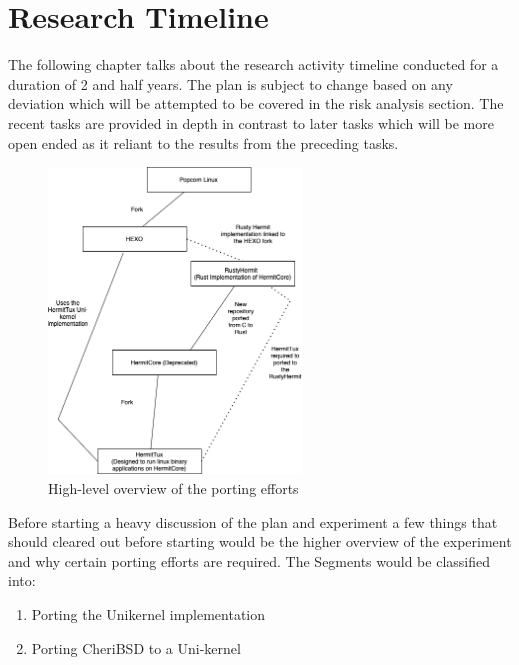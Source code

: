 


\chapter{Research Timeline}  %

\ifpdf
    \graphicspath{{ResearchTimeline/Figs/Raster/}{ResearchTimeline/Figs/PDF/}{ResearchTimeline/Figs/}}
\else
    \graphicspath{{ResearchTimeline/Figs/}{ResearchTimeline/Figs/}}
\fi

The following chapter talks about the research activity timeline conducted for a duration of 2 and half years. 
The plan is subject to change based on any deviation which will be attempted to be covered in the risk analysis 
section. The recent tasks are provided in depth in contrast to later tasks which will be more open ended 
as it reliant to the results from the preceding tasks. 

\begin{figure}[htbp!] 
  \centering    
  \includegraphics[width=0.6\textwidth]{PlannerActivity}
  \caption[High-level overview of the porting efforts]{High-level overview of the porting efforts}
  \label{fig:PlannerPorting}
  \end{figure}

Before starting a heavy discussion of the plan and experiment a few things that should cleared out before starting would be 
the higher overview of the experiment and why certain porting efforts are required. The Segments would be classified into: 
\begin{enumerate}
  \item Porting the Unikernel implementation 
  \item Porting CheriBSD to a Uni-kernel
\end{enumerate}

